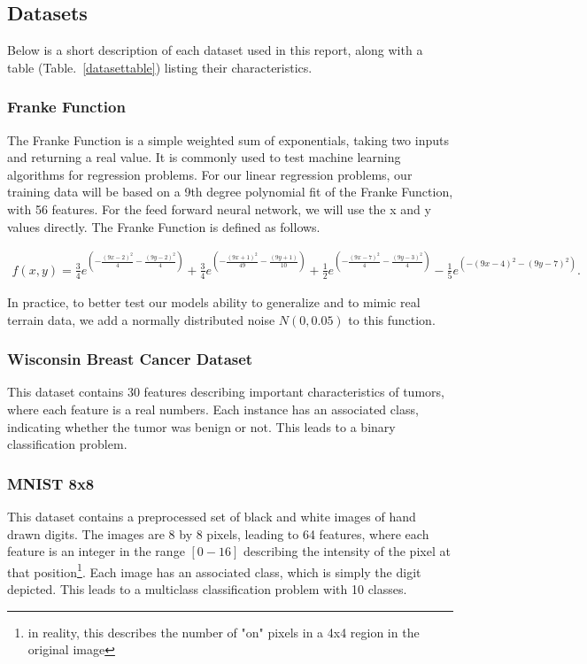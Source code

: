 \documentclass[onecolumn,10pt,cleanfoot]{asme2ej}
\begin{document}
\subsection{Datasets}

Below is a short description of each dataset used in this report, along with a table (Table.~\ref{datasettable}) listing their characteristics.

\subsubsection{Franke Function}

The Franke Function is a simple weighted sum of exponentials, taking two inputs and returning a real value. It is commonly used to test machine learning algorithms for regression problems. For our linear regression problems, our training data will be based on a 9th degree polynomial fit of the Franke Function, with 56 features. For the feed forward neural network, we will use the x and y values directly. The Franke Function is defined as follows.


\begin{multline}
f(x,y) = \frac{3}{4}e^{\left(-\frac{(9x-2)^2}{4}-\frac{(9y-2)^2}{4}\right)} +  \frac{3}{4}e^{\left(-\frac{(9x+1)^2}{49}-\frac{(9y+1)}{10}\right)} +
\frac{1}{2}e^{\left(-\frac{(9x-7)^2}{4}-\frac{(9y-3)^2}{4}\right)} - 
\frac{1}{5}e^{\left(-(9x-4)^2-(9y-7)^2\right)}.
\end{multline}

In practice, to better test our models ability to generalize and to mimic real terrain data, we add a normally distributed noise $N(0,0.05)$ to this function.

\subsubsection{Wisconsin Breast Cancer Dataset}

This dataset contains 30 features describing important characteristics of tumors, where each feature is a real numbers. Each instance has an associated class, indicating whether the tumor was benign or not. This leads to a binary classification problem.

\subsubsection{MNIST 8x8}

This dataset contains a preprocessed set of black and white images of hand drawn digits. The images are 8 by 8 pixels, leading to 64 features, where each feature is an integer in the range $[0-16]$ describing the intensity of the pixel at that position\footnote{in reality, this describes the number of "on" pixels in a 4x4 region in the original image}. Each image has an associated class, which is simply the digit depicted. This leads to a multiclass classification problem with 10 classes.
\end{document}
